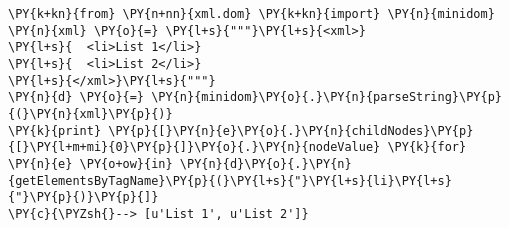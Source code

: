 \begin{Verbatim}[commandchars=\\\{\}]
\PY{k+kn}{from} \PY{n+nn}{xml.dom} \PY{k+kn}{import} \PY{n}{minidom}
\PY{n}{xml} \PY{o}{=} \PY{l+s}{"""}\PY{l+s}{<xml>}
\PY{l+s}{  <li>List 1</li>}
\PY{l+s}{  <li>List 2</li>}
\PY{l+s}{</xml>}\PY{l+s}{"""}
\PY{n}{d} \PY{o}{=} \PY{n}{minidom}\PY{o}{.}\PY{n}{parseString}\PY{p}{(}\PY{n}{xml}\PY{p}{)}
\PY{k}{print} \PY{p}{[}\PY{n}{e}\PY{o}{.}\PY{n}{childNodes}\PY{p}{[}\PY{l+m+mi}{0}\PY{p}{]}\PY{o}{.}\PY{n}{nodeValue} \PY{k}{for} \PY{n}{e} \PY{o+ow}{in} \PY{n}{d}\PY{o}{.}\PY{n}{getElementsByTagName}\PY{p}{(}\PY{l+s}{"}\PY{l+s}{li}\PY{l+s}{"}\PY{p}{)}\PY{p}{]}
\PY{c}{\PYZsh{}--> [u'List 1', u'List 2']}
\end{Verbatim}
